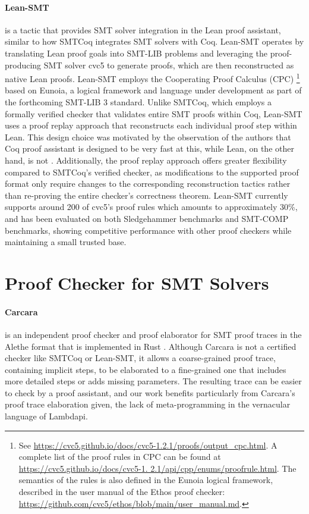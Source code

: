 \paragraph{Lean-SMT} is a tactic that provides SMT solver integration in the Lean proof assistant, similar to how SMTCoq integrates SMT solvers with Coq.
Lean-SMT operates by translating Lean proof goals into SMT-LIB problems and leveraging the proof-producing SMT solver cvc5 to generate proofs, which are then reconstructed as native Lean proofs.
Lean-SMT employs the Cooperating Proof Calculus (CPC)
%
\footnote{See \url{https://cvc5.github.io/docs/cvc5-1.2.1/proofs/output_cpc.html}. A complete
list of the proof rules in CPC can be found at \url{https://cvc5.github.io/docs/cvc5-1.
2.1/api/cpp/enums/proofrule.html}. The semantics of the rules is also defined in the
Eunoia logical framework, described in the user manual of the Ethos proof checker:
\url{https://github.com/cvc5/ethos/blob/main/user_manual.md}.}
%
based on Eunoia, a logical framework and language under development as part of the forthcoming SMT-LIB 3 standard.
Unlike SMTCoq, which employs a formally verified checker that validates entire SMT proofs within Coq, Lean-SMT uses a proof replay approach that reconstructs each individual proof step within Lean.
This design choice was motivated by the observation of the authors that Coq proof assistant is designed to be very fast at this, while Lean, on the other hand, is not \cite{lean-perf}.
Additionally, the proof replay approach offers greater flexibility compared to SMTCoq's verified checker, as modifications to the supported proof format only require changes to the corresponding reconstruction tactics rather than re-proving the entire checker's correctness theorem.
Lean-SMT currently supports around 200 of cvc5's proof rules which amounts to approximately 30\%, and has been evaluated on both Sledgehammer benchmarks and SMT-COMP benchmarks, showing competitive performance with other proof checkers while maintaining a small trusted base.


\section{Proof Checker for SMT Solvers}

\paragraph{Carcara} \cite{carcara} is an independent proof checker and proof elaborator for SMT proof traces in the Alethe format that is implemented in Rust \cite{rust}.
Although Carcara is not a certified checker like SMTCoq or Lean-SMT, it allows a coarse-grained proof trace, containing implicit steps, to be elaborated to a fine-grained one that includes more detailed steps or adds missing parameters.
The resulting trace can be easier to check by a proof assistant, and our work benefits particularly from Carcara's proof trace elaboration given, the lack of meta-programming in the vernacular language of Lambdapi.


